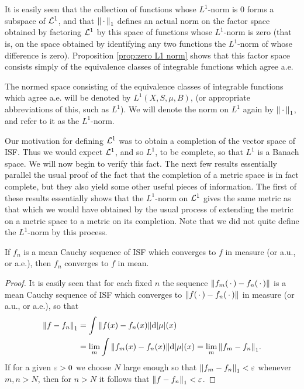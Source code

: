 It is easily seen that the collection of functions whose $L^1$-norm is $0$ forms a subspace of ${\cal L}^1$, and that $\norm{\,\cdot\,}_1$ defines an actual norm on the factor space obtained by factoring ${\cal L}^1$ by this space of functions whose $L^1$-norm is zero (that is, on the space obtained by identifying any two functions the $L^1$-norm of whose difference is zero). Proposition \ref{prop:zero L1 norm} shows that this factor space consists simply of the equivalence classes of integrable functions which agree a.e.

\begin{definition}
The normed space consisting of the equivalence classes of integrable functions which agree a.e. will be denoted by $L^1(X,S,\mu,B)$, (or appropriate abbreviations of this, such as $L^1$). We will denote the norm on $L^1$ again by $\norm{\,\cdot\,}_1$, and refer to it as the $L^1$-norm.
\end{definition}

Our motivation for defining ${\cal L}^1$ was to obtain a completion of the vector space of ISF. Thus we would expect ${\cal L}^1$, and so $L^1$, to be complete, so that $L^1$ is a Banach space. We will now begin to verify this fact. The next few results essentially parallel the usual proof of the fact that the completion of a metric space is in fact complete, but they also yield some other useful pieces of information. The first of these results essentially shows that the $L^1$-norm on ${\cal L}^1$ gives the same metric as that which we would have obtained by the usual process of extending the metric on a metric space to a metric on its completion. Note that we did not quite define the $L^1$-norm by this process.

\begin{lemma}\label{lem:ISF converge in measure implies mean}
If $f_n$ is a mean Cauchy sequence of ISF which converges to $f$ in measure (or a.u., or a.e.), then $f_n$ converges to $f$ in mean.
\end{lemma}

\begin{proof}
It is easily seen that for each fixed $n$ the sequence $\norm{f_m(\,\cdot\,)-f_n(\,\cdot\,)}$ is a mean Cauchy sequence of ISF which converges to $\norm{f(\,\cdot\,)-f_n(\,\cdot\,)}$ in measure (or a.u., or a.e.), so that
\begin{align*}
    \norm{f-f_n}_1&=\int\norm{f(x)-f_n(x)}\dd|\mu|(x)\\
    &=\lim_m\int\norm{f_m(x)-f_n(x)}\dd|\mu|(x)=\lim_m\norm{f_m-f_n}_1.
\end{align*}
If for a given $\varepsilon>0$ we choose $N$ large enough so that $\norm{f_m-f_n}_1<\varepsilon$ whenever $m,n>N$, then for $n>N$ it follows that $\norm{f-f_n}_1<\varepsilon$.
\end{proof}

